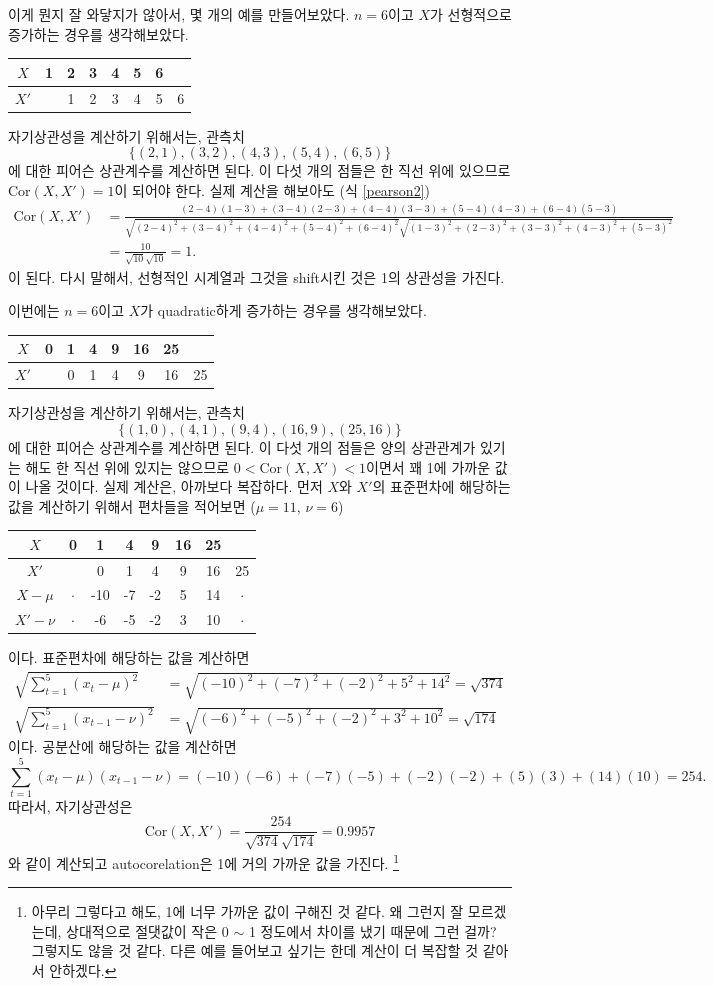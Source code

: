 \documentclass{article}
\begin{document}
이게 뭔지 잘 와닿지가 않아서, 몇 개의 예를 만들어보았다.
\(n=6\)이고 \(X\)가 선형적으로 증가하는 경우를 생각해보았다.
\begin{center}
\begin{tabular}{c|ccccccc}
$X$ &1&2&3&4&5&6&\\\hline
$X'$& &1&2&3&4&5&6
\end{tabular}
\end{center}
자기상관성을 계산하기 위해서는, 관측치
\[\{(2,1),(3,2),(4,3),(5,4),(6,5)\}\]
에 대한 피어슨 상관계수를 계산하면 된다.
이 다섯 개의 점들은 한 직선 위에 있으므로 \(\text{Cor}(X,X')=1\)이 되어야 한다.
실제 계산을 해보아도 (식 \eqref{pearson2})
\begin{align*}
\text{Cor}(X,X')
&=\frac{(2-4)(1-3)+(3-4)(2-3)+(4-4)(3-3)+(5-4)(4-3)+(6-4)(5-3)}{\sqrt{(2-4)^2+(3-4)^2+(4-4)^2+(5-4)^2+(6-4)^2}\sqrt{(1-3)^2+(2-3)^2+(3-3)^2+(4-3)^2+(5-3)^2}}\\
&=\frac{10}{\sqrt{10}\sqrt{10}}=1.
\end{align*}
이 된다.
다시 말해서, 선형적인 시계열과 그것을 shift시킨 것은 1의 상관성을 가진다.

이번에는 $n=6$이고 $X$가 quadratic하게 증가하는 경우를 생각해보았다.
\begin{center}
\begin{tabular}{c|ccccccc}
$X$ &0&1&4&9&16&25&\\\hline
$X'$& &0&1&4&9&16&25
\end{tabular}
\end{center}
자기상관성을 계산하기 위해서는, 관측치
\[\{(1,0),(4,1),(9,4),(16,9),(25,16)\}\]
에 대한 피어슨 상관계수를 계산하면 된다.
이 다섯 개의 점들은 양의 상관관계가 있기는 해도 한 직선 위에 있지는 않으므로 \(0<\text{Cor}(X,X')<1\)이면서 꽤 1에 가까운 값이 나올 것이다.
실제 계산은, 아까보다 복잡하다.
먼저 $X$와 $X'$의 표준편차에 해당하는 값을 계산하기 위해서 편차들을 적어보면 (\(\mu=11\), \(\nu=6\))
\begin{center}
\begin{tabular}{c|ccccccc}
$X$ &0&1&4&9&16&25&\\\hline
$X'$& &0&1&4&9&16&25\\\hline
$X-\mu$&$\cdot$&-10&-7&-2&5&14&$\cdot$\\\hline
$X'-\nu$&$\cdot$&-6&-5&-2&3&10&$\cdot$
\end{tabular}
\end{center}
이다.
표준편차에 해당하는 값을 계산하면
\begin{align*}
\sqrt{\sum_{t=1}^5(x_t-\mu)^2}
&=\sqrt{(-10)^2+(-7)^2+(-2)^2+5^2+14^2}=\sqrt{374}\\
\sqrt{\sum_{t=1}^5(x_{t-1}-\nu)^2}
&=\sqrt{(-6)^2+(-5)^2+(-2)^2+3^2+10^2}=\sqrt{174}
\end{align*}
이다. 공분산에 해당하는 값을 계산하면
\[\sum_{t=1}^5(x_t-\mu)(x_{t-1}-\nu)=(-10)(-6)+(-7)(-5)+(-2)(-2)+(5)(3)+(14)(10)=254.\]
따라서, 자기상관성은
\[\text{Cor}(X,X')=\frac{254}{\sqrt{374}\sqrt{174}}=0.9957\]
와 같이 계산되고 autocorelation은 1에 거의 가까운 값을 가진다.
\footnote{아무리 그렇다고 해도, 1에 너무 가까운 값이 구해진 것 같다.
왜 그런지 잘 모르겠는데, 상대적으로 절댓값이 작은 0 \(\sim\) 1 정도에서 차이를 냈기 때문에 그런 걸까? 그렇지도 않을 것 같다.
다른 예를 들어보고 싶기는 한데 계산이 더 복잡할 것 같아서 안하겠다.}
\end{document}
